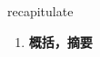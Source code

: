 
\begin{frame}
{\huge recapitulate}
\begin{center}
\begin{enumerate}\Large
  \item \textbf{概括，摘要}
\end{enumerate}
\end{center}
\end{frame}
